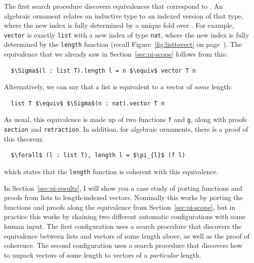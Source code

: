 
The first search procedure discovers equivalences that correspond to .
An algebraic ornament relates an inductive type to an indexed version of that type,
where the new index is fully determined by a unique fold over \Aa. 
For example, \lstinline{vector} is exactly \lstinline{list} with a new index of type \lstinline{nat},
where the new index is fully determined by the \lstinline{length} function (recall Figure~\ref{fig:listtovect} on page~\pageref{fig:listtovect}).
The equivalence that we already saw in Section~\ref{sec:pi-scope} follows from this:

\begin{lstlisting}
  $\Sigma$(l : list T).length l = n $\equiv$ vector T n
\end{lstlisting}
Alternatively, we can say that a list is equivalent to a vector of \textit{some} length:

\begin{lstlisting}
  list T $\equiv$ $\Sigma$(n : nat).vector T n
\end{lstlisting}
As usual, this equivalence is made up of two functions \lstinline{f} and \lstinline{g}, along with proofs \lstinline{section} and \lstinline{retraction}.
In addition, for algebraic ornaments, there is a proof of this theorem:

\begin{lstlisting}
  $\forall$ (l : list T), length l = $\pi_{l}$ (f l)
\end{lstlisting}
which states that the \lstinline{length} function is coherent with this equivalence.

In Section~\ref{sec:pi-results}, I will show you a case study of porting functions and proofs from lists to length-indexed vectors.
Nominally this works by porting the functions and proofs along the equivalence from Section~\ref{sec:pi-scope},
but in practice this works by chaining two different automatic configurations with some human input.
The first configuration uses a search procedure that discovers the equivalence between lists and vectors of some length above,
as well as the proof of coherence.
The second configuration uses a search procedure that discovers how to unpack vectors of some length to vectors of a \textit{particular} length.

